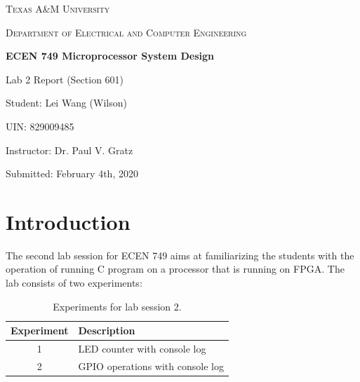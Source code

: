\documentclass[11pt,letterpaper,titlepage]{article}
\begin{document}
\begin{titlepage}
  \centering
	{\scshape\large Texas A\&M University \par}
	\vspace{1cm}
	{\scshape\Large Department of Electrical and Computer Engineering \par}
	\vspace{4cm}
    \vspace{0.5cm}
	{\huge\bfseries ECEN 749 Microprocessor System Design\par}
	\vspace{4cm}
	{\Large Lab 2 Report (Section 601)\par}
	\vspace{1cm}
	{\Large Student: Lei Wang (Wilson)\par}
	\vspace{1cm}
	{\Large UIN: 829009485\par}
	\vspace{1cm}
	{\Large Instructor: Dr. Paul V. Gratz\par}
	\vspace{4cm}
	\vfill

	{\large Submitted: February 4th, 2020 \par}

\end{titlepage}

\newpage

\tableofcontents{}

\newpage

\part{Introduction}

The second lab session for ECEN 749 aims at familiarizing the students with the operation of running C program on a processor that is running on FPGA. The lab consists of two experiments:

\begin{table}[ht]
\centering
\begin{tabular}{@{}cl@{}}
\toprule
Experiment & Description                      \\ \midrule
1          & LED counter with console log     \\ \midrule
2          & GPIO operations with console log \\ \bottomrule
\end{tabular}
\caption{Experiments for lab session 2.}
\end{table}
\end{document}

